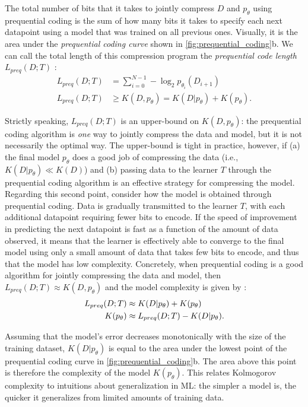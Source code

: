 \documentclass{article} %
\begin{document}
\begin{appendices}
The total number of bits that it takes to jointly compress $D$ and $p_\theta$ using prequential coding is the sum of how many bits it takes to specify each next datapoint using a model that was trained on all previous ones. Visually, it is the area under the \textit{prequential coding curve} shown in \cref{fig:prequential_coding}b. We can call the total length of this compression program the \textit{prequential code length} $L_{preq}(D ; T)$ \citep{blier2018description}:
\begin{align}
    \label{eq:L_preq}
    L_{preq}(D ; T) &= \sum_{i=0}^{N-1} -\log_2 p_{\theta_i}(D_{i+1}) \\
    \label{eq:L_preq_K_relation}
    L_{preq}(D ; T) &\ge K(D, p_\theta) = K(D|p_\theta) + K(p_\theta) .
\end{align}

Strictly speaking, $L_{preq}(D ; T)$ is an upper-bound on $K(D, p_\theta)$: the prequential coding algorithm is \emph{one} way to jointly compress the data and model, but it is not necessarily the optimal way. The upper-bound is tight in practice, however, if (a) the final model $p_\theta$ does a good job of compressing the data (i.e., $K(D|p_\theta) \ll K(D)$) and (b) passing data to the learner $T$ through the prequential coding algorithm is an effective strategy for compressing the model. Regarding this second point, consider how the model is obtained through prequential coding. Data is gradually transmitted to the learner $T$, with each additional datapoint requiring fewer bits to encode. If the speed of improvement in predicting the next datapoint is fast as a function of the amount of data observed, it means that the learner is effectively able to converge to the final model using only a small amount of data that takes few bits to encode, and thus that the model has low complexity. Concretely, when prequential coding is a good algorithm for jointly compressing the data and model, then $L_{preq}(D ; T) \approx K(D, p_\theta)$ and the model complexity is given by \citep{blier2018description}:
\begin{align}
    L_{preq}(D ; T) &\approx K(D|p_\theta) + K(p_\theta) \notag \\
    K(p_\theta) &\approx L_{preq}(D ; T) - K(D|p_\theta) .
\end{align}

Assuming that the model's error decreases monotonically with the size of the training dataset, $K(D|p_\theta)$ is equal to the area under the lowest point of the prequential coding curve in \cref{fig:prequential_coding}b. The area above this point is therefore the complexity of the model $K(p_\theta)$. This relates Kolmogorov complexity to intuitions about generalization in ML: the simpler a model is, the quicker it generalizes from limited amounts of training data.



\end{appendices}
\end{document}
